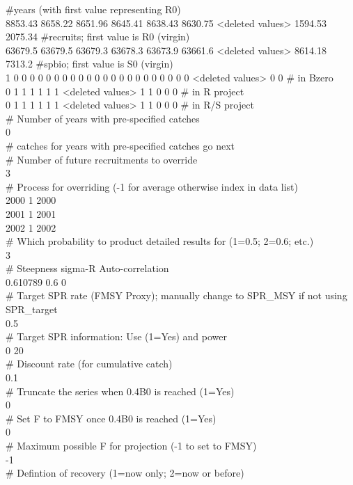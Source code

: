 \#years (with first value representing R0)\\
8853.43  8658.22 8651.96 8645.41 8638.43 8630.75 <deleted values> 1594.53 2075.34 \#recruits; first value is R0 (virgin)\\
63679.5  63679.5 63679.3 63678.3 63673.9 63661.6 <deleted values> 8614.18 7313.2 \#spbio; first value is S0 (virgin)\\
1 0 0 0 0 0 0 0 0 0 0 0 0 0 0 0 0 0 0 0 0 0 0 <deleted values> 0 0  \# in Bzero\\
0 1 1 1 1 1 1 <deleted values> 1 1  0 0 0 \# in R project\\
0 1 1 1 1 1 1 <deleted values> 1 1  0 0 0 \# in R/S project\\
\# Number of years with pre-specified catches\\
0\\
\# catches for years with pre-specified catches go next\\
\# Number of future recruitments to override\\
3\\
\# Process for overriding (-1 for average otherwise index in data list)\\
2000 1 2000\\
2001 1 2001\\
2002 1 2002\\
\# Which probability to product detailed results for (1=0.5; 2=0.6; etc.)\\
3\\
\# Steepness sigma-R Auto-correlation\\
0.610789 0.6 0 \\
\# Target SPR rate (FMSY Proxy); manually change to SPR\_MSY if not using SPR\_target\\
0.5\\
\# Target SPR information: Use (1=Yes) and power\\
0 20\\
\# Discount rate (for cumulative catch)\\
0.1\\
\# Truncate the series when 0.4B0 is reached (1=Yes)\\
0\\
\# Set F to FMSY once 0.4B0 is reached (1=Yes)\\
0\\
\# Maximum possible F for projection (-1 to set to FMSY)\\
-1\\
\# Defintion of recovery (1=now only; 2=now or before)\\
